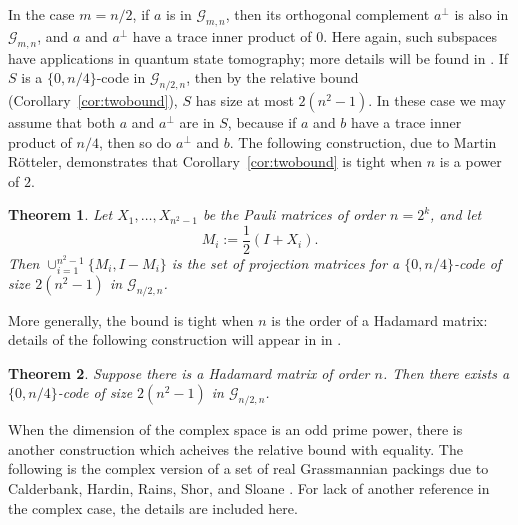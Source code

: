 \documentclass[12pt]{article}
\numberwithin{equation}{section}
\theoremstyle{plainsl}
\newtheorem{theorem}{Theorem}[section]
\newtheorem{lemma}[theorem]{Lemma}
\newcommand\al{\alpha}
\newcommand\be{\beta}
\newcommand\gras[2]{\mathcal{G}_{#1,#2}}
\begin{document}
In the case $m = n/2$, if $a$ is in $\gras{m}{n}$, then its orthogonal complement $a^{\perp}$ is also in $\gras{m}{n}$, and $a$ and $a^{\perp}$ have a trace inner product of $0$. Here again, such subspaces have applications in quantum state tomography; more details will be found in \cite{grr}. If $S$ is a $\{0,n/4\}$-code in $\gras{n/2}{n}$, then by the relative bound (Corollary~\ref{cor:twobound}), $S$ has size at most $2(n^2-1)$. In these case we may assume that both $a$ and $a^{\perp}$ are in $S$, because if $a$ and $b$ have a trace inner product of $n/4$, then so do $a^{\perp}$ and $b$. The following construction, due to Martin R\"otteler, demonstrates that Corollary~\ref{cor:twobound} is tight when $n$ is a power of $2$.
\begin{theorem}
\label{thm:pauli}
Let $X_1,\ldots,X_{n^2-1}$ be the Pauli matrices of order $n = 2^k$, and let 
\[
M_i := \frac{1}{2}(I + X_i).
\]
Then $\cup_{i=1}^{n^2-1} \{M_i,I-M_i\}$ is the set of projection matrices for a $\{0,n/4\}$-code of size $2(n^2-1)$ in $\gras{n/2}{n}$. 
\end{theorem}
More generally, the bound is tight when $n$ is the order of a Hadamard matrix: details of the following construction will appear in in \cite{grr}.

\begin{theorem}
\label{thm:hadspace}
Suppose there is a Hadamard matrix of order $n$. Then there exists a $\{0,n/4\}$-code of size $2(n^2-1)$ in $\gras{n/2}{n}$. 
\end{theorem}

When the dimension of the complex space is an odd prime power, there is another construction which acheives the relative bound with equality. The following is the complex version of a set of real Grassmannian packings due to Calderbank, Hardin, Rains, Shor, and Sloane \cite{chrss}. For lack of another reference in the complex case, the details are included here.
\end{document}

